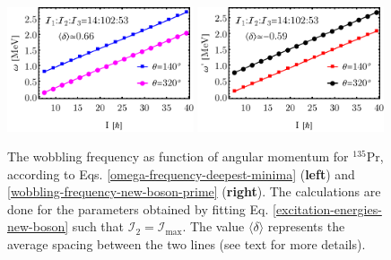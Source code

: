 \begin{figure}
    \centering
    \includegraphics[width=0.49\textwidth]{Chapters/Figures/omega-fit-2.pdf}
    \includegraphics[width=0.49\textwidth]{Chapters/Figures/omega-prime-fit-2.pdf}
    \caption{The wobbling frequency as function of angular momentum for $^{135}$Pr, according to Eqs. \ref{omega-frequency-deepest-minima} (\textbf{left}) and \ref{wobbling-frequency-new-boson-prime} (\textbf{right}). The calculations are done for the parameters obtained by fitting Eq. \ref{excitation-energies-new-boson} such that $\mathcal{I}_2=\mathcal{I}_\text{max}$. The value $\langle\delta\rangle$ represents the average spacing between the two lines (see text for more details).}
    \label{wobbling-frequencies-135pr-fit2}
\end{figure}
